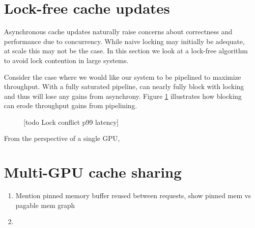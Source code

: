 \section{Lock-free cache updates} \label{Implementation: Lock-free}
Asynchronous cache updates naturally raise concerns about correctness and performance due to concurrency. While naive locking may initially be adequate, at scale this may not be the case. In this section we look at a lock-free algorithm to avoid lock contention in large systems.

Consider the case where we would like our system to be pipelined to maximize throughput. 
With a fully saturated pipeline, can nearly fully block with locking and thus will lose any gains from asynchrony.
Figure \ref{Impl: Contended pipeline} illustrates how blocking can erode throughput gains from pipelining.

\begin{figure}[h!]
    \centering
    
    \caption{[todo Lock conflict p99 latency]}
    \label{Impl: Contended pipeline}
\end{figure}    

From the perspective of a single GPU,


\section{Multi-GPU cache sharing} \label{Implementation: Multi-GPU}

\begin{enumerate}
    \item Mention pinned memory buffer reused between requests, show pinned mem vs pagable mem graph
    \item 
\end{enumerate}